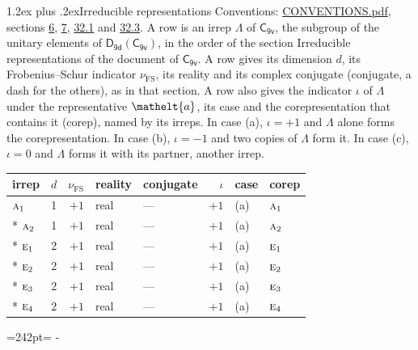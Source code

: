 \documentclass[10pt,a4paper]{article}
\makeatletter
\renewcommand\section{\@startsection{section}{1}{\z@}{-3ex plus -1ex minus -.2ex}%
  {1.2ex plus .2ex}{\normalfont\large\sffamily\bfseries\color{parttitle}}}
\newcommand{\needspace}[1]{\par\penalty-100\begingroup\dimen0=#1\relax\dimen2=\pagegoal
  \advance\dimen2-\pagetotal\ifdim\dimen0>\dimen2\relax\ifdim\dimen2>0pt\vfil\break\fi\fi
  \endgroup}
\numberwithin{equation}{section}
\newcommand{\eltfont}[1]{{\let\sigma\eltsigma\mathelt{#1}}}
\newcommand{\grp}[1]{\mathsf{#1}}
\newcommand{\irr}[1]{\text{\normalfont\scshape #1}}
\newcommand{\elt}[1]{\eltfont{#1}}
\newcommand{\fsind}{\nu_{\mathrm{FS}}}
\makeatother
\begin{document}
\section{Irreducible representations}\label{s:irreps}
Conventions: \href{../../CONVENTIONS.pdf}{CONVENTIONS.pdf}, sections \href{../../../rotation/CONVENTIONS.pdf\#conv.6}{6}, \href{../../../rotation/CONVENTIONS.pdf\#conv.7}{7}, \href{../../CONVENTIONS.pdf\#conv.32.1}{32.1} and \href{../../CONVENTIONS.pdf\#conv.32.3}{32.3}.
\leavevmode\label{n:irrep.Delta}A row is an irrep $\Lambda$ of $\grp{C_{9v}}$, the subgroup of the unitary elements of $\grp{D_{9d}}(\grp{C_{9v}})$, in the order of the section Irreducible representations of the document of \href{../../../rotation/data/pdf/C9v.pdf}{$\grp{C_{9v}}$}. \label{n:index.dimension}\label{n:index.frobenius}\label{n:head.irrep}\label{n:head.reality}\label{n:head.conjugate}A row gives its dimension $d$, its Frobenius--Schur indicator $\fsind$, its reality and its complex conjugate (conjugate, a dash for the others), as in that section. \label{n:head.case.corep}\label{n:head.corep}A row also gives the indicator $\iota$ of $\Lambda$ under the representative $\elt{a}$, its case and the corepresentation that contains it (corep), named by its irreps. In case (a), $\iota = +1$ and $\Lambda$ alone forms the corepresentation. In case (b), $\iota = -1$ and two copies of $\Lambda$ form it. In case (c), $\iota = 0$ and $\Lambda$ forms it with its partner, another irrep.
\setlength{\emergencystretch}{2em}\par\setlength{\emergencystretch}{0pt}
{\small\renewcommand{\arraystretch}{1.25}\setlength{\tabcolsep}{4pt}\begin{longtable}{@{}lrrllrll@{}}\toprule
irrep & $d$ & $\fsind$ & reality & conjugate & $\iota$ & case & corep\\\midrule\endhead
\bottomrule\endfoot\endlastfoot
$\irr{a}_{1}$ & 1 & $+1$ & real & --- & $+1$ & (a) & $\irr{a}_{1}$\\*
$\irr{a}_{2}$ & 1 & $+1$ & real & --- & $+1$ & (a) & $\irr{a}_{2}$\\*
$\irr{e}_{1}$ & 2 & $+1$ & real & --- & $+1$ & (a) & $\irr{e}_{1}$\\*
$\irr{e}_{2}$ & 2 & $+1$ & real & --- & $+1$ & (a) & $\irr{e}_{2}$\\*
$\irr{e}_{3}$ & 2 & $+1$ & real & --- & $+1$ & (a) & $\irr{e}_{3}$\\*
$\irr{e}_{4}$ & 2 & $+1$ & real & --- & $+1$ & (a) & $\irr{e}_{4}$\\
\bottomrule\end{longtable}}
\needspace{242pt}
\end{document}
